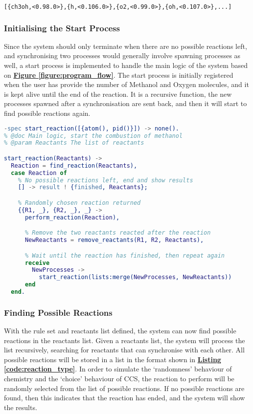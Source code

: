 \documentclass[12pt, a4paper]{article}
\begin{document}
\begin{lstlisting}[basicstyle=\ttfamily, label=code:reactants_list,
  caption=An example of reactants list.]
  [{ch3oh,<0.98.0>},{h,<0.106.0>},{o2,<0.99.0>},{oh,<0.107.0>},...]
\end{lstlisting}

\subsubsection{Initialising the Start Process} \label{subsubsec:start}
Since the system should only terminate when there are no possible reactions left, and synchronising
two processes would generally involve spawning processes as well, a start process is implemented to
handle the main logic of the system based on \hyperref[figure:program_flow]{\textbf{Figure
\ref*{figure:program_flow}}}. The start process is initially registered when the user has provide
the number of Methanol and Oxygen molecules, and it is kept alive until the end of the reaction. It
is a recursive function, the new processes spawned after a synchronisation are sent back, and then
it will start to find possible reactions again.

\begin{lstlisting}[language=erlang, basicstyle=\small, label=code:start_reaction,
  caption=A function that handles the main logic of the system]
-spec start_reaction([{atom(), pid()}]) -> none().
% @doc Main logic, start the combustion of methanol
% @param Reactants The list of reactants

start_reaction(Reactants) ->
  Reaction = find_reaction(Reactants),
  case Reaction of
    % No possible reactions left, end and show results
    [] -> result ! {finished, Reactants};

    % Randomly chosen reaction returned
    {{R1, _}, {R2, _}, _} ->
      perform_reaction(Reaction),

      % Remove the two reactants reacted after the reaction
      NewReactants = remove_reactants(R1, R2, Reactants),

      % Wait until the reaction has finished, then repeat again
      receive
        NewProcesses ->
          start_reaction(lists:merge(NewProcesses, NewReactants))
      end
  end.
\end{lstlisting}

\subsubsection{Finding Possible Reactions}
With the rule set and reactants list defined, the system can now find possible reactions in the
reactants list. Given a reactants list, the system will process the list recursively, searching for
reactants that can synchronise with each other. All possible reactions will be stored in a list in
the format shown in \hyperref[code:reaction_type]{\textbf{Listing \ref*{code:reaction_type}}}. In
order to simulate the `randomness' behaviour of chemistry and the `choice' behaviour of CCS, the
reaction to perform will be randomly selected from the list of possible reactions. If no possible
reactions are found, then this indicates that the reaction has ended, and the system will show the
results.
\end{document}
